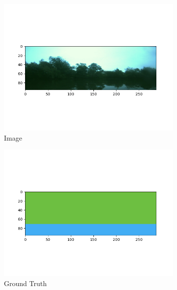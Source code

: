\documentclass[10pt,twocolumn,letterpaper]{article}
\begin{document}
\begin{figure}[hpt]
\begin{center}
    	\begin{subfigure}{0.3\textwidth}
  		\includegraphics[width=\linewidth, trim={1.25cm 1.5cm 1.5cm 1.25cm},clip]{image5.png}
  		\caption{Image}
  	  \end{subfigure}
  	  \hfill
  	  \begin{subfigure}{0.3\textwidth}
  		\includegraphics[width=\linewidth,trim={1.25cm 1.5cm 1.5cm 1.25cm},clip]{gt5.png}
  		\caption{Ground Truth}
  	\end{subfigure}
  		\hfill
  	\begin{subfigure}{0.3\textwidth}

\end{subfigure}
\end{center}
\end{figure}
\end{document}
